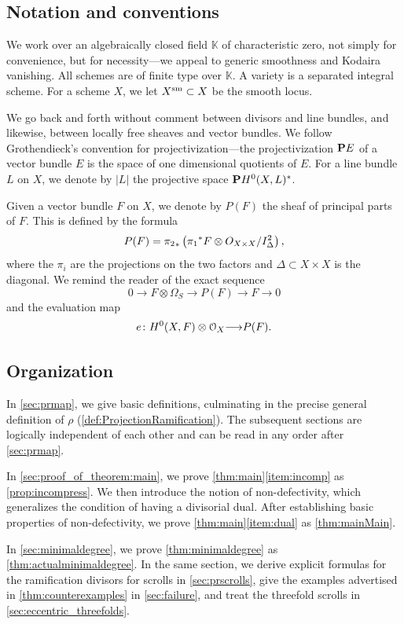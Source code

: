 \documentclass[11pt,reqno]{amsart}
\theoremstyle{plain}
\theoremstyle{definition}
\theoremstyle{remark}
\numberwithin{equation}{section}
\renewcommand{\k}{\mathbb{K}}
\renewcommand{\to}{{\longrightarrow}}
\numberwithin{equation}{section}
\renewcommand{\O}{\mathcal O}
\begin{document}
\subsection{Notation and conventions}
We work over an algebraically closed field $\k$ of characteristic zero, not simply for convenience, but for necessity---we appeal to generic smoothness and Kodaira vanishing.
All schemes are of finite type over $\k$.
A variety is a separated integral scheme.
For a scheme $X$, we let $X^{\rm sm} \subset X$ be the smooth locus.

We go back and forth without comment between divisors and line bundles, and likewise, between locally free sheaves and vector bundles.
We follow Grothendieck's convention for projectivization---the projectivization $\P E$ of a vector bundle $E$ is the space of one dimensional quotients of $E$.
For a line bundle $L$ on $X$, we denote by $|L|$ the projective space $\P H^0(X, L)^*$.

Given a vector bundle $F$ on $X$, we denote by $P(F)$ the sheaf of principal parts of $F$.
This is defined by the formula
\[ P(F) = {\pi_2}_* \left( {\pi_1}^* F \otimes \mathcal \O_{X \times X}/ I_{\Delta}^2 \right),\]
where the $\pi_i$ are the projections on the two factors and $\Delta \subset X \times X$ is the diagonal.
We remind the reader of the exact sequence
\[ 0 \to F \otimes \Omega_S \to P(F) \to F \to 0\]
and the evaluation map
\[ e \from H^0(X, F) \otimes \O_X \to P(F).\]

\subsection{Organization}
In \autoref{sec:prmap}, we give basic definitions, culminating in the precise general definition of $\rho$ (\autoref{def:ProjectionRamification}).
The subsequent sections are logically independent of each other and can be read in any order after \autoref{sec:prmap}.

In \autoref{sec:proof_of_theorem:main}, we prove \autoref{thm:main}\eqref{item:incomp} as \autoref{prop:incompress}.
We then introduce the notion of non-defectivity, which generalizes the condition of having a divisorial dual.
After establishing basic properties of non-defectivity, we prove \autoref{thm:main}\eqref{item:dual} as \autoref{thm:mainMain}.

In \autoref{sec:minimaldegree}, we prove \autoref{thm:minimaldegree} as \autoref{thm:actualminimaldegree}.
In the same section, we derive explicit formulas for the ramification divisors for scrolls in \autoref{sec:prscrolls}, give the examples advertised in \autoref{thm:counterexamples} in \autoref{sec:failure}, and treat the threefold scrolls in \autoref{sec:eccentric_threefolds}.
\end{document}
